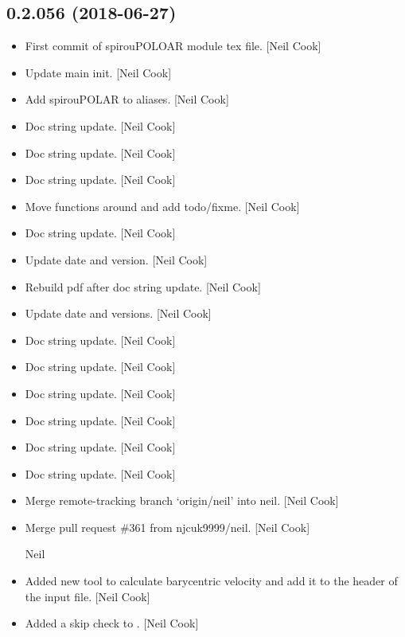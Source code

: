 \documentclass[a4paper,10pt,english]{report}
\begin{document}
\subsection{0.2.056 (2018-06-27)}
\label{\detokenize{misc/changelog:id409}}\begin{itemize}
\item {} 
First commit of spirouPOLOAR module tex file. {[}Neil Cook{]}

\item {} 
Update main init. {[}Neil Cook{]}

\item {} 
Add spirouPOLAR to aliases. {[}Neil Cook{]}

\item {} 
Doc string update. {[}Neil Cook{]}

\item {} 
Doc string update. {[}Neil Cook{]}

\item {} 
Doc string update. {[}Neil Cook{]}

\item {} 
Move functions around and add todo/fixme. {[}Neil Cook{]}

\item {} 
Doc string update. {[}Neil Cook{]}

\item {} 
Update date and version. {[}Neil Cook{]}

\item {} 
Rebuild pdf after doc string update. {[}Neil Cook{]}

\item {} 
Update date and versions. {[}Neil Cook{]}

\item {} 
Doc string update. {[}Neil Cook{]}

\item {} 
Doc string update. {[}Neil Cook{]}

\item {} 
Doc string update. {[}Neil Cook{]}

\item {} 
Doc string update. {[}Neil Cook{]}

\item {} 
Doc string update. {[}Neil Cook{]}

\item {} 
Doc string update. {[}Neil Cook{]}

\item {} 
Merge remote-tracking branch ‘origin/neil’ into neil. {[}Neil Cook{]}

\item {} 
Merge pull request \#361 from njcuk9999/neil. {[}Neil Cook{]}

Neil

\item {} 
Added new tool to calculate barycentric velocity and add it to the
header of the input file. {[}Neil Cook{]}

\item {} 
Added a skip check to . {[}Neil Cook{]}

\end{itemize}
\end{document}
